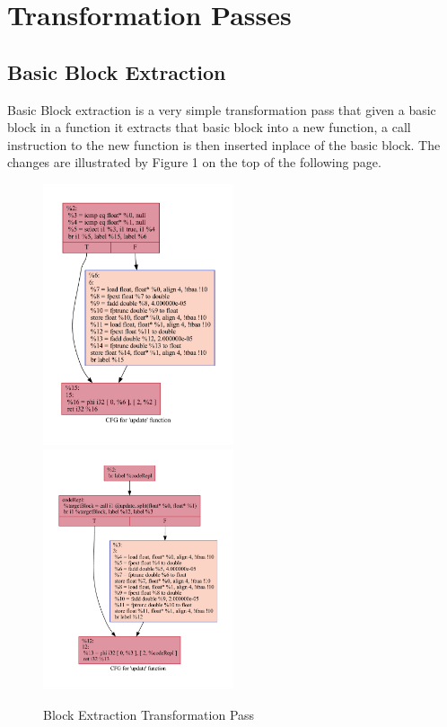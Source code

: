 \section{Transformation Passes}

\subsection{Basic Block Extraction}

Basic Block extraction is a very simple transformation pass that given a basic block in a function it extracts
that basic block into a new function, a call instruction to the new function is then inserted inplace of the basic block.
The changes are illustrated by Figure 1 on the top of the following page.

\begin{figure}[t]
  \includegraphics[width=0.5\textwidth]{./images/update.pdf}
  \includegraphics[width=0.5\textwidth]{./images/block-extraction-update.pdf}
  \caption{Block Extraction Transformation Pass}
\end{figure}

